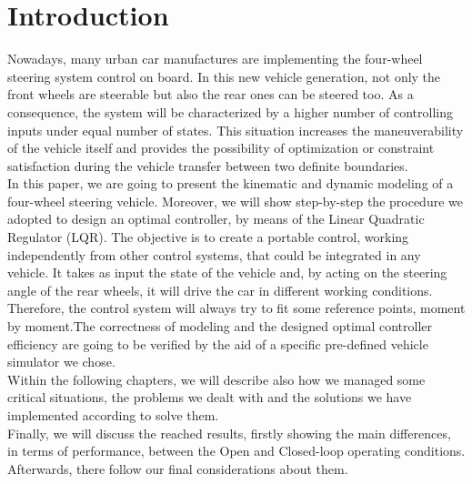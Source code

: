 
\chapter{Introduction}
	Nowadays, many urban car manufactures are implementing the four-wheel steering system control on board. In this new vehicle generation, not only the front wheels are steerable but also the rear ones can be steered too. As a consequence, the system will be characterized by a higher number of controlling inputs under equal number of states. This situation increases the maneuverability of the vehicle itself and provides the possibility of optimization or constraint satisfaction during the vehicle transfer between two definite boundaries.\\
	In this paper, we are going to present the kinematic and dynamic modeling of a four-wheel steering vehicle. Moreover, we will show step-by-step the procedure we adopted to design an optimal controller, by means of the Linear Quadratic Regulator (LQR). The objective is to create a portable control, working independently from other control systems, that could be integrated in any vehicle. It takes as input the state of the vehicle and, by acting on the steering angle of the rear wheels, it will drive the car in different working conditions. Therefore, the control system will always try to fit some reference points, moment by moment.The correctness of modeling and the designed optimal controller efficiency are going to be verified by the aid of a specific pre-defined vehicle simulator we chose.\\
	Within the following chapters, we will describe also how we managed some critical situations, the problems we dealt with and the solutions we have implemented according to solve them. \\
	Finally, we will discuss the reached results, firstly showing the main differences, in terms of performance, between the Open and Closed-loop operating conditions. Afterwards, there follow our final considerations about them. 
